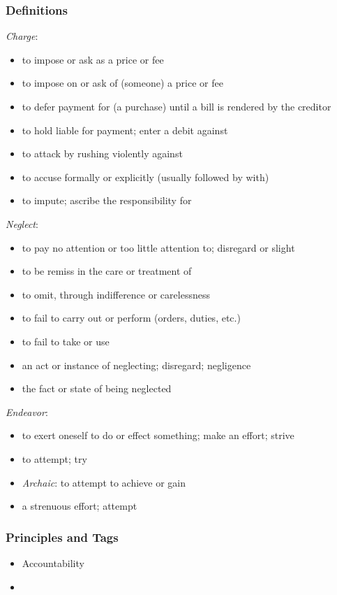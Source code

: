 \documentclass[12pt]{report}
\begin{document}
\subsubsection{Definitions\label{js:DFN22}}
\emph{Charge}: \begin{itemize}
\item to impose or ask as a price or fee
\item to impose on or ask of (someone) a price or fee
\item to defer payment for (a purchase) until a bill is rendered by the creditor
\item to hold liable for payment; enter a debit against
\item to attack by rushing violently against
\item to accuse formally or explicitly (usually followed by with)
\item to impute; ascribe the responsibility for
\end{itemize}
\emph{Neglect}: \begin{itemize}
\item to pay no attention or too little attention to; disregard or slight
\item to be remiss in the care or treatment of
\item to omit, through indifference or carelessness
\item to fail to carry out or perform (orders, duties, etc.)
\item to fail to take or use
\item an act or instance of neglecting; disregard; negligence
\item the fact or state of being neglected
\end{itemize}
\emph{Endeavor}: \begin{itemize}
\item to exert oneself to do or effect something; make an effort; strive
\item to attempt; try
\item \emph{Archaic}: to attempt to achieve or gain
\item a strenuous effort; attempt
\end{itemize}

\subsubsection{Principles and Tags\label{js:principles22}}
\begin{itemize}
\item {}Accountability
\item {}
\end{itemize}
\end{document}
